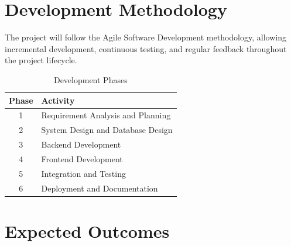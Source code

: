 \documentclass[12pt,a4paper]{article}
\begin{document}

\section{Development Methodology}

The project will follow the Agile Software Development methodology, allowing incremental development, continuous testing, and regular feedback throughout the project lifecycle.

\begin{table}[h]

\centering

\renewcommand{\arraystretch}{1.4}

\begin{tabular}{|c|p{10cm}|}

\hline

\textbf{Phase} & \textbf{Activity} \\

\hline

1 & Requirement Analysis and Planning \\

\hline

2 & System Design and Database Design \\

\hline

3 & Backend Development \\

\hline

4 & Frontend Development \\

\hline

5 & Integration and Testing \\

\hline

6 & Deployment and Documentation \\

\hline

\end{tabular}

\caption{Development Phases}

\end{table}


\section{Expected Outcomes}
\end{document}
